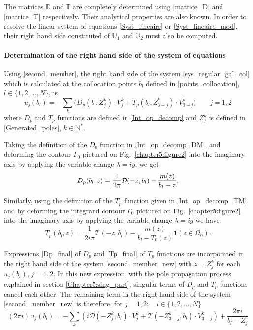 The matrices $\mathbb{D}$ and $\mathbb{T}$ are completely determined using \eqref{matrice_D} and \eqref{matrice_T} respectively. Their analytical properties are also known. In order to resolve the linear system of equations \eqref{Syst_lineaire} or \eqref{Syst_lineaire_mod},  their right hand side constituted of $\mathbb{U}_1$ and $\mathbb{U}_2$ must also be computed.

\paragraph{Determination of the right hand side of the system of equations}

Using \eqref{second_member}, the right hand side of the system \eqref{sys_regular_gal_col} which is calculated at the collocation points $b_l$ defined in \eqref{points_collocation}, $l \in \{ 1,2, \ldots, N \}$, is 
\begin{equation}
\label{second_member_new}
u_j(b_l) = -\sum_k \Big( D_p(b_l,Z_j^k)\cdot V_j^k+ T_p(b_l,Z_{3-j}^k)\cdot V_{3-j}^k\Big) \qquad j=1,2
\end{equation}
where $D_p$ and $T_p$ functions are defined in \eqref{Int_op_decomp} and $Z_j^k$ is defined in \eqref{Generated_poles}, $k \in \mathbb{N}^*$. 

Taking the definition of the $D_p$ function in \eqref{Int_op_decomp_DM}, and deforming the contour $\Gamma_0$ pictured on Fig.~\ref{chapter5:figure2} into the imaginary axis by applying the variable change $\lambda = iy$, we get
\begin{equation}
\label{Dp_final}
D_p(b_l,z) = {1\over 2\pi}\mathcal D(-z,b_l)-  {m(z)\over b_l-z}.
\end{equation}

Similarly, using the definition of the $T_p$ function given in \eqref{Int_op_decomp_TM}, and by deforming the integrand contour $\Gamma_0$ pictured on Fig.~\ref{chapter5:figure2} into the imaginary axis by applying the variable change $\lambda = iy$ we have
\begin{equation}
\label{Tp_final}
T_p(b_l,z) = 
\dfrac{1}{2i\pi} \mathcal T(-z,b_l) - \dfrac{m(z)}{b_l - T_0(z)} \mathbf{1} (z \in \Omega_0) .
\end{equation}

Expressions \eqref{Dp_final} of $D_p$ and \eqref{Tp_final} of $T_p$ functions are incorporated in the right hand side of the system \eqref{second_member_new} with $z = Z_j^k$ for each $u_j(b_l), \, j=1,2$. In this new expression, with the pole propagation process explained in section \ref{Chapter5:sing_part}, singular terms of $D_p$ and $T_p$ functions cancel each other. The remaining term in the right hand side of the system \eqref{second_member_new} is therefore, for $j=1,2; \quad l \in \{ 1,2, \ldots, N \}$
\begin{equation}
(2\pi i) \, u_j(b_l) =  - \sum_k \left( i \mathcal D(-Z_j^k,b_l)\cdot V_j^k  + \mathcal T(-Z_{3-j}^k,b_l) 
\cdot V_{3-j}^k  \right) +  \dfrac{2\pi i}{b_l - Z_j}
\end{equation}

